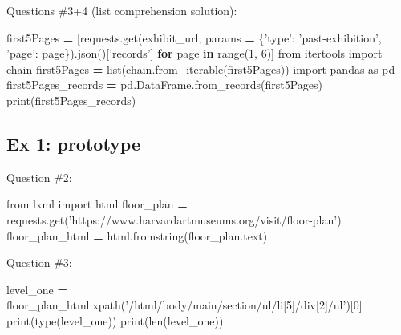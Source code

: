 \documentclass[
]{book}
\newenvironment{Shaded}{\begin{snugshade}}{\end{snugshade}}
\newcommand{\BuiltInTok}[1]{#1}
\newcommand{\ControlFlowTok}[1]{\textcolor[rgb]{0.13,0.29,0.53}{\textbf{#1}}}
\newcommand{\DecValTok}[1]{\textcolor[rgb]{0.00,0.00,0.81}{#1}}
\newcommand{\ImportTok}[1]{#1}
\newcommand{\KeywordTok}[1]{\textcolor[rgb]{0.13,0.29,0.53}{\textbf{#1}}}
\newcommand{\NormalTok}[1]{#1}
\newcommand{\OperatorTok}[1]{\textcolor[rgb]{0.81,0.36,0.00}{\textbf{#1}}}
\newcommand{\StringTok}[1]{\textcolor[rgb]{0.31,0.60,0.02}{#1}}
\begin{document}
Questions \#3+4 (list comprehension solution):

\begin{Shaded}
\begin{Highlighting}[]
\NormalTok{first5Pages }\OperatorTok{=}\NormalTok{ [requests.get(exhibit_url, params }\OperatorTok{=}\NormalTok{ \{}\StringTok{'type'}\NormalTok{: }\StringTok{'past-exhibition'}\NormalTok{, }\StringTok{'page'}\NormalTok{: page\}).json()[}\StringTok{'records'}\NormalTok{] }\ControlFlowTok{for}\NormalTok{ page }\KeywordTok{in} \BuiltInTok{range}\NormalTok{(}\DecValTok{1}\NormalTok{, }\DecValTok{6}\NormalTok{)]}
\ImportTok{from}\NormalTok{ itertools }\ImportTok{import}\NormalTok{ chain}
\NormalTok{first5Pages }\OperatorTok{=} \BuiltInTok{list}\NormalTok{(chain.from_iterable(first5Pages))}
\ImportTok{import}\NormalTok{ pandas }\ImportTok{as}\NormalTok{ pd}
\NormalTok{first5Pages_records }\OperatorTok{=}\NormalTok{ pd.DataFrame.from_records(first5Pages)}
\BuiltInTok{print}\NormalTok{(first5Pages_records)}
\end{Highlighting}
\end{Shaded}

\hypertarget{ex-1-prototype-5}{%
\subsection{Ex 1: prototype}\label{ex-1-prototype-5}}

Question \#2:

\begin{Shaded}
\begin{Highlighting}[]
\ImportTok{from}\NormalTok{ lxml }\ImportTok{import}\NormalTok{ html}
\NormalTok{floor_plan }\OperatorTok{=}\NormalTok{ requests.get(}\StringTok{'https://www.harvardartmuseums.org/visit/floor-plan'}\NormalTok{)}
\NormalTok{floor_plan_html }\OperatorTok{=}\NormalTok{ html.fromstring(floor_plan.text)}
\end{Highlighting}
\end{Shaded}

Question \#3:

\begin{Shaded}
\begin{Highlighting}[]
\NormalTok{level_one }\OperatorTok{=}\NormalTok{ floor_plan_html.xpath(}\StringTok{'/html/body/main/section/ul/li[5]/div[2]/ul'}\NormalTok{)[}\DecValTok{0}\NormalTok{]}
\BuiltInTok{print}\NormalTok{(}\BuiltInTok{type}\NormalTok{(level_one))}
\BuiltInTok{print}\NormalTok{(}\BuiltInTok{len}\NormalTok{(level_one))}
\end{Highlighting}
\end{Shaded}
\end{document}
